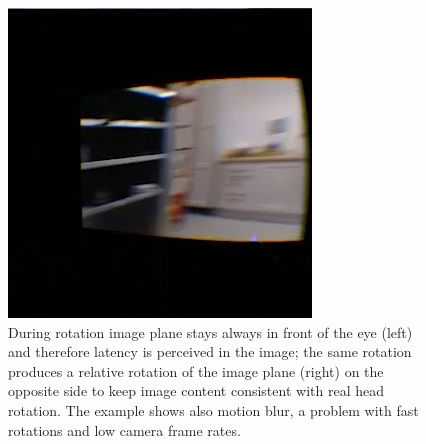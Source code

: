 \begin{figure}
\begin{minipage}[t]{0.46\textwidth}
\includegraphics[width=\linewidth]{pictures/yes_stabilization_rotation}
\end{minipage}
\caption{During rotation image plane stays always in front of the eye (left) and therefore latency is perceived in the image; the same rotation produces a relative rotation of the image plane (right) on the opposite side to keep image content consistent with real head rotation. The example shows also motion blur, a problem with fast rotations and low camera frame rates.}
\label{fig:stabilization_comparison_example}
\end{figure}

